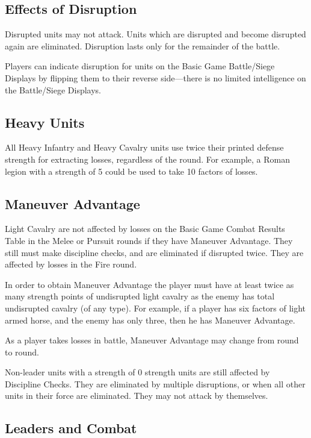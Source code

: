 \subsection{Effects of Disruption}

Disrupted units may not attack.
Units which are disrupted and become disrupted again are eliminated.
Disruption lasts only for the remainder of the battle.

Players can indicate disruption for units on the Basic Game Battle/Siege Displays by flipping them to their reverse side—there is no limited intelligence on the Battle/Siege Displays.

\subsection{Heavy Units}

All Heavy Infantry and Heavy Cavalry units use twice their printed defense strength for extracting losses, regardless of the round. For example, a Roman legion with a strength of 5 could be used to take 10 factors of losses.

\subsection{Maneuver Advantage}

Light Cavalry are not affected by losses on the Basic Game Combat Results Table in the Melee or Pursuit rounds if they have Maneuver Advantage. They still must make discipline checks, and are eliminated if disrupted twice. They are affected by losses in the Fire round.

In order to obtain Maneuver Advantage the player must have at least twice as many strength points of undisrupted light cavalry as the enemy has total undisrupted cavalry (of any type). For example, if a player has six factors of light armed horse, and the enemy has only three, then he has Maneuver Advantage.

As a player takes losses in battle, Maneuver Advantage may change from round to round.

Non-leader units with a strength of 0 strength units are still affected by Discipline Checks. They are eliminated by multiple disruptions, or when all other units in their force are eliminated. They may not attack by themselves.

\subsection{Leaders and Combat}

